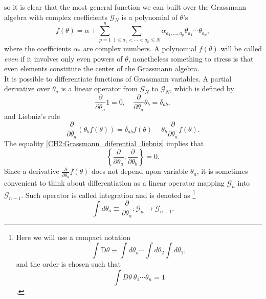 so it is clear that the most general function we can built over the Grassmann algebra with complex coefficients $\mathcal{G}_{N}$ is  a polynomial of $\theta$'s
\begin{equation}
f(\theta)=\alpha+\sum_{p=1}^{n} \sum_{1 \leq a_{1}<\cdots<a_{p} \leq N} \alpha_{a_{1}, \ldots, a_{p}} \theta_{a_{1}} \cdots \theta_{a_{p}},
\label{CH2:Grassmann_function}
\end{equation}
where the coefficients $\alpha_{*}$ are complex numbers. A polynomial $f(\theta)$ will be called \textit{even} if it involves only even powers of $\theta$, nonetheless something to stress is that even elements constitute the center of the Grassmann algebra.\\
It is possible to differentiate functions of Grassmann variables. A partial derivative over $\theta_{a}$ is a linear operator from $\mathcal{G}_{N}$ to $ \mathcal{G}_{N}$, which is defined by
\begin{equation}
\frac{\partial}{\partial \theta_{a}} 1=0, \quad \frac{\partial}{\partial \theta_{a}} \theta_{b}=\delta_{a b},
\label{CH2:Grassmann_diferential}
\end{equation}
and Liebniz's rule
\begin{equation}
\frac{\partial}{\partial \theta_{a}}\left(\theta_{b} f(\theta)\right)=\delta_{a b} f(\theta)-\theta_{b} \frac{\partial}{\partial \theta_{a}} f(\theta).
\label{CH2:Grassmann_diferential_liebniz}
\end{equation}
The equality \eqref{CH2:Grassmann_diferential_liebniz} implies that 
\begin{equation}
\left\{\frac{\partial}{\partial \theta_{a}}, \frac{\partial}{\partial \theta_{b}}\right\}=0.
\label{CH2:Grassmann_partial_derivative_anticommutation}
\end{equation}
Since a derivative $\frac{\partial}{\partial\theta_{a}}f(\theta)$ does not depend upon variable $\theta_{a}$, it is sometimes convenient to think about differentiation as a linear operator mapping $\mathcal{G}_{n}$ into $\mathcal{G}_{n-1}$. Such operator is called integration and is denoted as\cite{bravyi_lagrangian_2004} \footnote{Here we will use a compact notation \[\int \mathrm{D} \theta \equiv \int d \theta_{n} \cdots \int d \theta_{2} \int d \theta_{1},\] and the order is chosen such that \[\int D\theta\ \theta_1\cdots\theta_n = 1\].
}
\begin{equation}
\int d \theta_{a} \equiv \frac{\partial}{\partial \theta_{a}}: \mathcal{G}_{n} \rightarrow \mathcal{G}_{n-1}.
\label{CH2:Grassmann_Integration_relation}
\end{equation}

